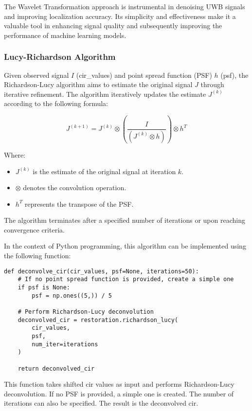 The Wavelet Transformation approach is instrumental in denoising UWB signals and improving localization accuracy. Its simplicity and effectiveness make it a valuable tool in enhancing signal quality and subsequently improving the performance of machine learning models.

\subsubsection{Lucy-Richardson Algorithm}

Given observed signal $I$ (cir\_values) and point spread function (PSF) $h$ (psf), the Richardson-Lucy algorithm aims to estimate the original signal $J$ through iterative refinement. The algorithm iteratively updates the estimate $J^{(k)}$ according to the following formula:

\begin{equation}
J^{(k+1)} = J^{(k)} \otimes \left( \frac{I}{(J^{(k)} \otimes h)} \right) \otimes h^T
\end{equation}

Where:
\begin{itemize}
    \item $J^{(k)}$ is the estimate of the original signal at iteration $k$.
    \item $\otimes$ denotes the convolution operation.
    \item $h^T$ represents the transpose of the PSF. 
\end{itemize}


The algorithm terminates after a specified number of iterations or upon reaching convergence criteria.

In the context of Python programming, this algorithm can be implemented using the following function:

\begin{verbatim}
def deconvolve_cir(cir_values, psf=None, iterations=50):
    # If no point spread function is provided, create a simple one
    if psf is None:
        psf = np.ones((5,)) / 5

    # Perform Richardson-Lucy deconvolution
    deconvolved_cir = restoration.richardson_lucy(
        cir_values, 
        psf, 
        num_iter=iterations
    )

    return deconvolved_cir
\end{verbatim}

This function takes shifted \acrshort{cir} values as input and performs Richardson-Lucy deconvolution. If no PSF is provided, a simple one is created. The number of iterations can also be specified. The result is the deconvolved \acrshort{cir}.

